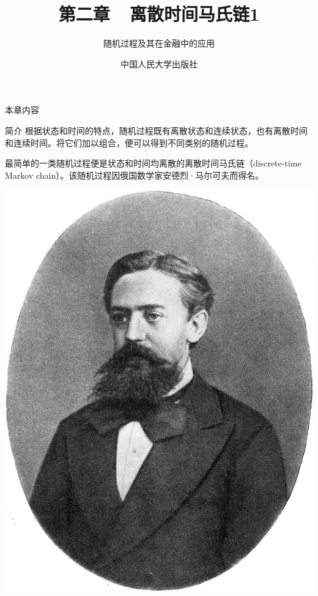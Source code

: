 \documentclass[t]{beamer}
\begin{document}
\fontsize{11}{18}\selectfont


\CTEXindent



  \title{第二章~~离散时间马氏链1}
\author{随机过程及其在金融中的应用}
\date{中国人民大学出版社}
  \begin{frame}
    \maketitle
  \end{frame}

\begin{frame}{本章内容}
  \begin{multicols}{2}
    \tableofcontents
  \end{multicols}
\end{frame}

\begin{frame}{简介}
    根据状态和时间的特点，随机过程既有离散状态和连续状态，也有离散时间和连续时间。将它们加以组合，便可以得到不同类别的随机过程。

    最简单的一类随机过程便是状态和时间均离散的离散时间马氏链（discrete-time Markov chain）。该随机过程因俄国数学家安德烈·马尔可夫而得名。
    \begin{center}
        \includegraphics[height=.38\textheight]{fig/markov.jpg}
    \end{center}
\end{frame}
\end{document}
